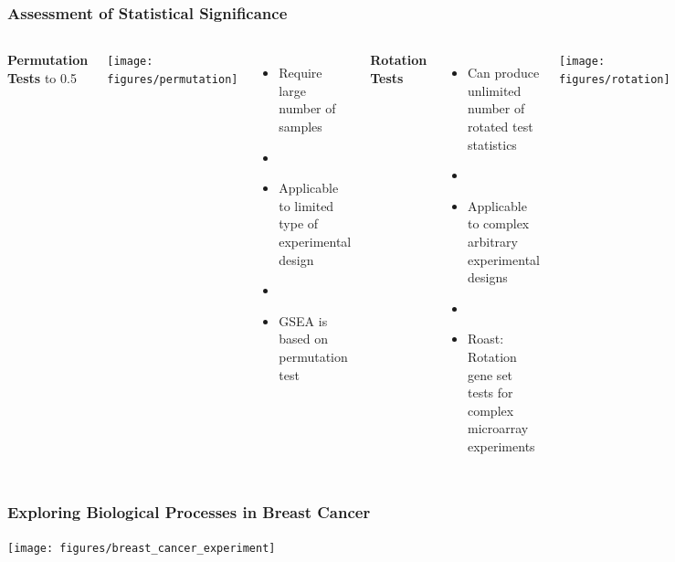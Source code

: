 \documentclass[9pt,t]{beamer}
\begin{document}
\begin{frame}
	\frametitle{Assessment of Statistical Significance}
	\vspace{0.1cm}
	\begin{columns}
	\centering
    \textbf{\color{oxygenpurple} Permutation Tests}
	\vbox to 0.5\textheight
	{
	\vspace{0.02\textwidth}
	\centering
    \texttt{[image: figures/permutation]}                
	\vspace{0.02cm}
	\begin{itemize}
		\item Require large number of samples 
		\item[]
		\item Applicable to limited type of experimental design
		\item[]
		\item GSEA is based on permutation test
		\end{itemize}
    }                       
	\centering
	{\color{oxygenpurple}\textbf{Rotation Tests}}
	\begin{itemize}
	\item Can produce unlimited number of rotated test statistics
	\item[]
	\item Applicable to complex arbitrary experimental designs
	\item[]	
	\item Roast: Rotation gene set tests for complex microarray experiments
	\end{itemize}
	\vspace{0.02cm}
	\texttt{[image: figures/rotation]}
	\end{columns}
\end{frame}

\begin{frame}
	\frametitle{Exploring Biological Processes in Breast Cancer}
	\centering
	\texttt{[image: figures/breast\_cancer\_experiment]}
\end{frame}
\end{document}
